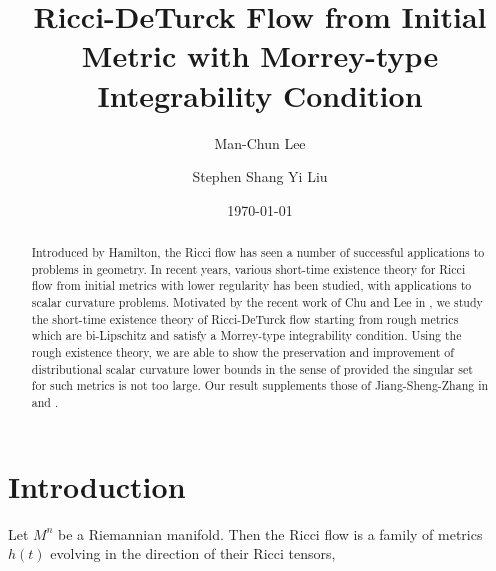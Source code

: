 \documentclass[12pt]{amsart}
\theoremstyle{plain}
\theoremstyle{plain}
\theoremstyle{definition}
\theoremstyle{remark}
\numberwithin{equation}{subsection}
\begin{document}
\title[]
{Ricci-DeTurck Flow from Initial Metric with Morrey-type Integrability Condition}

\author{Man-Chun Lee}
\address[Man-Chun Lee]{Room 237, Lady Shaw Building,
The Chinese University of Hong Kong,
Shatin, N.T., Hong Kong}

\author{Stephen Shang Yi Liu}
\address[Stephen Shang Yi Liu]{Room 222A, Lady Shaw Building,
The Chinese University of Hong Kong,
Shatin, N.T., Hong Kong}

\renewcommand{\subjclassname}{
  \textup{2010} Mathematics Subject Classification}

\date{\today}

\begin{abstract}
    Introduced by Hamilton, the Ricci flow has seen a number of successful applications to problems in geometry. In recent years, various short-time existence theory for Ricci flow from initial metrics with lower regularity has been studied, with applications to scalar curvature problems. Motivated by the recent work of Chu and Lee in \cite{chu_ricci-deturck_2022}, we study the short-time existence theory of Ricci-DeTurck flow starting from rough metrics which are bi-Lipschitz and satisfy a Morrey-type integrability condition. Using the rough existence theory, we are able to show the preservation and improvement of distributional scalar curvature lower bounds in the sense of \cite{lee_positive_2015} provided the singular set for such metrics is not too large. Our result supplements those of Jiang-Sheng-Zhang in \cite{jiang_weak_2021} and \cite{jiang_removable_2022}.
\end{abstract}


\maketitle

%
%
%

\section{Introduction}

Let $M^n$ be a Riemannian manifold. Then the Ricci flow is a family of metrics $h(t)$ evolving in the direction of their Ricci tensors,
\end{document}
